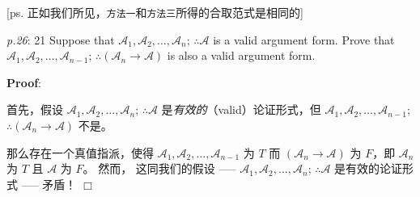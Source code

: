 \documentclass[UTF8,12pt,a4paper]{ctexart}
\begin{document}
[ps. 正如我们所见，\texttt{方法一}和\texttt{方法三}所得的合取范式是相同的] 

\vspace{3em}

\emph{p.26}: 21 \quad
Suppose that $\mathscr{A}_1,\mathscr{A}_2,\dots,\mathscr{A}_n$;  $\therefore\mathscr{A}$ is a valid argument form. Prove that $\mathscr{A}_1,\mathscr{A}_2,\dots,\mathscr{A}_{n-1}$;  $\therefore (\mathscr{A}_n \to \mathscr{A})$ is also a valid argument form.

\noindent\textbf{Proof}:

首先，假设
$\mathscr{A}_1,\mathscr{A}_2,\dots,\mathscr{A}_n$;  $\therefore\mathscr{A}$ 
是\textit{有效的}（valid）论证形式，但 $\mathscr{A}_1,\mathscr{A}_2,\dots,\mathscr{A}_{n-1}$;  $\therefore (\mathscr{A}_n \to \mathscr{A})$ 不是。 

那么存在一个真值指派，使得
$\mathscr{A}_1,\mathscr{A}_2,\dots,\mathscr{A}_{n-1}$ 为 $T$ 
而 $(\mathscr{A}_n \to \mathscr{A})$ 为 $F$，即 
$\mathscr{A}_n $ 为 $T$ 且 $\mathscr{A}$ 为 $F$。
然而，
这同我们的假设 ----- $\mathscr{A}_1,\mathscr{A}_2,\dots,\mathscr{A}_n$;  $\therefore\mathscr{A}$ 是有效的论证形式 ----- 矛盾！
\hfill $\Box$
\end{document}
